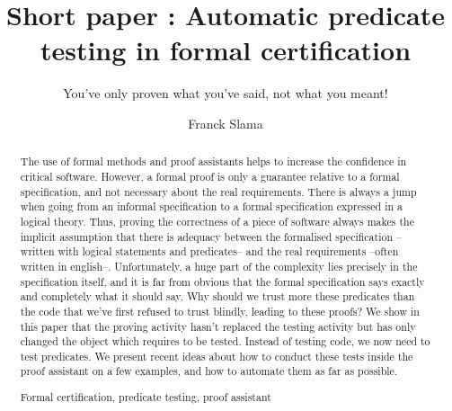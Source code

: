 \documentclass[runningheads,a4paper]{llncs}
\newcommand{\keywords}[1]{\par\addvspace\baselineskip
\noindent\keywordname\enspace\ignorespaces#1}
\begin{document}
\mainmatter  %

\title{Short paper : Automatic predicate testing in formal certification}
\subtitle{You've only proven what you've said, not what you meant!}



\author{Franck Slama\\
         }


\maketitle


\begin{abstract}
The use of formal methods and proof assistants helps to increase the confidence in critical software. However, a formal proof is only a guarantee relative to a formal specification, and not necessary about the real requirements. There is always a jump when going from an informal specification to a formal specification expressed in a logical theory. Thus, proving the correctness of a piece of software always makes the implicit assumption that there is adequacy between the formalised specification --written with logical statements and predicates-- and the real requirements --often written in english--. Unfortunately, a huge part of the complexity lies precisely in the specification itself, and it is far from obvious that the formal specification says exactly and completely what it should say. Why should we trust more these predicates than the code that we've first refused to trust blindly, leading to these proofs? We show in this paper that the proving activity hasn't replaced the testing activity but has only changed the object which requires to be tested. Instead of testing code, we now need to test predicates. We present recent ideas about how to conduct these tests inside the proof assistant on a few examples, and how to automate them as far as possible.

\keywords{Formal certification, predicate testing, proof assistant}
\end{abstract}




















\nocite{DeMillo1979}


\end{document}

